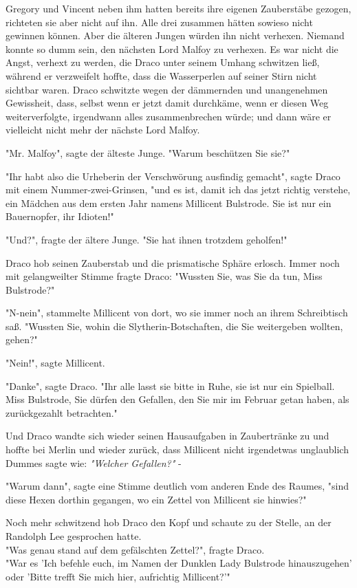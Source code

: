 {Gregory und Vincent neben ihm hatten bereits ihre eigenen Zauberstäbe gezogen, richteten sie aber nicht auf ihn. Alle drei zusammen hätten sowieso nicht gewinnen können. Aber die älteren Jungen würden ihn nicht verhexen. Niemand konnte so dumm sein, den nächsten Lord Malfoy zu verhexen. Es war nicht die Angst, verhext zu werden, die Draco unter seinem Umhang schwitzen ließ, während er verzweifelt hoffte, dass die Wasserperlen auf seiner Stirn nicht sichtbar waren. Draco schwitzte wegen der dämmernden und unangenehmen Gewissheit, dass, selbst wenn er jetzt damit durchkäme, wenn er diesen Weg weiterverfolgte, irgendwann alles zusammenbrechen würde; und dann wäre er vielleicht nicht mehr der nächste Lord Malfoy.

"Mr. Malfoy", sagte der älteste Junge. "Warum beschützen Sie sie?"

"Ihr habt also die Urheberin der Verschwörung ausfindig gemacht", sagte Draco mit einem Nummer-zwei-Grinsen, "und es ist, damit ich das jetzt richtig verstehe, ein Mädchen aus dem ersten Jahr namens Millicent Bulstrode. Sie ist nur ein Bauernopfer, ihr Idioten!"

"Und?", fragte der ältere Junge. "Sie hat ihnen trotzdem geholfen!"

Draco hob seinen Zauberstab und die prismatische Sphäre erlosch. Immer noch mit gelangweilter Stimme fragte Draco: "Wussten Sie, was Sie da tun, Miss Bulstrode?"

"N-nein", stammelte Millicent von dort, wo sie immer noch an ihrem Schreibtisch saß. "Wussten Sie, wohin die Slytherin-Botschaften, die Sie weitergeben wollten, gehen?"

"Nein!", sagte Millicent.

"Danke", sagte Draco. "Ihr alle lasst sie bitte in Ruhe, sie ist nur ein Spielball. Miss Bulstrode, Sie dürfen den Gefallen, den Sie mir im Februar getan haben, als zurückgezahlt betrachten."

Und Draco wandte sich wieder seinen Hausaufgaben in Zaubertränke zu und hoffte bei Merlin und wieder zurück, dass Millicent nicht irgendetwas unglaublich Dummes sagte wie: \emph{"Welcher Gefallen?"} -

"Warum dann", sagte eine Stimme deutlich vom anderen Ende des Raumes, "sind diese Hexen dorthin gegangen, wo ein Zettel von Millicent sie hinwies?"

Noch mehr schwitzend hob Draco den Kopf und schaute zu der Stelle, an der Randolph Lee gesprochen hatte.\\ "Was genau stand auf dem gefälschten Zettel?", fragte Draco.\\ "War es 'Ich befehle euch, im Namen der Dunklen Lady Bulstrode hinauszugehen' oder 'Bitte trefft Sie mich hier, aufrichtig Millicent?'"

}

